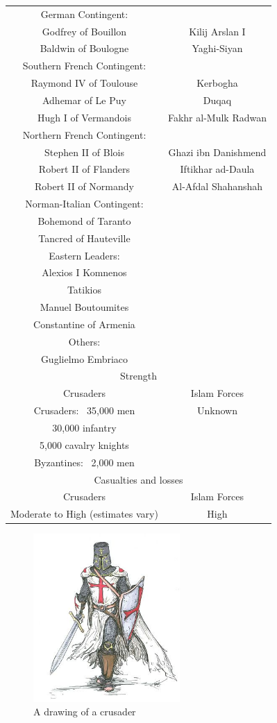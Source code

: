 \documentclass[11pt]{book}
\begin{document}
\begin{longtable}[c]{| c | c |}
German Contingent: & \\
Godfrey of Bouillon & Kilij Arslan I\\
Baldwin of Boulogne & Yaghi-Siyan \\
Southern French Contingent: & \\
Raymond IV of Toulouse & Kerbogha \\
Adhemar of Le Puy & Duqaq \\
Hugh I of Vermandois & Fakhr al-Mulk Radwan \\
Northern French Contingent:  & \\
Stephen II of Blois & Ghazi ibn Danishmend \\
Robert II of Flanders & Iftikhar ad-Daula \\
Robert II of Normandy & Al-Afdal Shahanshah \\
Norman-Italian Contingent: & \\
Bohemond of Taranto &	\\
Tancred of Hauteville & \\
Eastern Leaders: & \\
Alexios I Komnenos & \\
Tatikios & \\
Manuel Boutoumites & \\
Constantine of Armenia & \\
Others: & \\
Guglielmo Embriaco & \\ 
  \hline
 \multicolumn{2}{|c|}{Strength} \\
 \hline
  Crusaders& Islam Forces\\
 \hline
Crusaders:~ 35,000 men & Unknown \\
30,000 infantry & \\
5,000 cavalry knights & \\
Byzantines:~ 2,000 men & \\
  \hline
 \multicolumn{2}{|c|}{Casualties and losses} \\
 \hline
   Crusaders& Islam Forces\\
 \hline
 Moderate to High (estimates vary) & High \\
\end{longtable}
\cite{CrusadeBook4}
\begin{figure}
\caption{A drawing of a crusader}
\centering
\label{fig:pictureofcrusader}
\includegraphics[width=0.5\textwidth]{one}
\end{figure}
\end{document}
